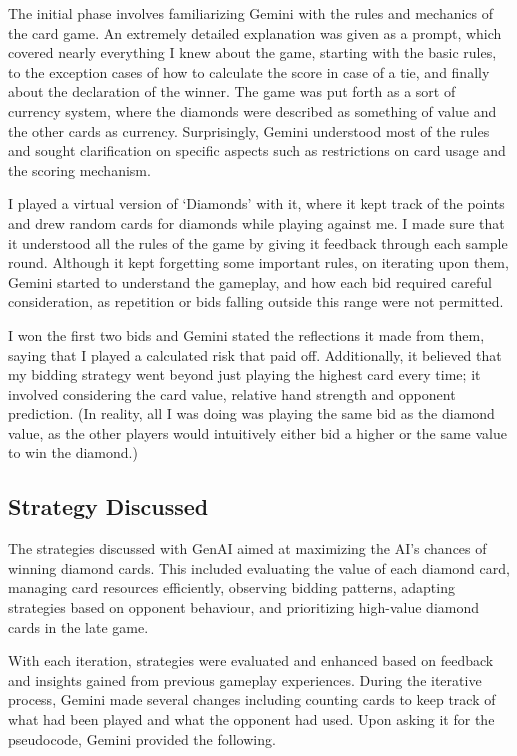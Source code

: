 \documentclass{article}
\begin{document}
The initial phase involves familiarizing Gemini with the rules and mechanics of the card game. An extremely detailed explanation was given as a prompt, which covered nearly everything I knew about the game, starting with the basic rules, to the exception cases of how to calculate the score in case of a tie, and finally about the declaration of the winner. The game was put forth as a sort of currency system, where the diamonds were described as something of value and the other cards as currency. Surprisingly, Gemini understood most of the rules and sought clarification on specific aspects such as restrictions on card usage and the scoring mechanism.
\vspace{10pt}

I played a virtual version of ‘Diamonds’ with it, where it kept track of the points and drew random cards for diamonds while playing against me. I made sure that it understood all the rules of the game by giving it feedback through each sample round. Although it kept forgetting some important rules, on iterating upon them, Gemini started to understand the gameplay, and how each bid required careful consideration, as repetition or bids falling outside this range were not permitted.
\vspace{10pt}

I won the first two bids and Gemini stated the reflections it made from them, saying that I played a calculated risk that paid off. Additionally, it believed that my bidding strategy went beyond just playing the highest card every time; it involved considering the card value, relative hand strength and opponent prediction. (In reality, all I was doing was playing the same bid as the diamond value, as the other players would intuitively either bid a higher or the same value to win the diamond.)

\vspace{7pt}
\subsection{Strategy Discussed}

The strategies discussed with GenAI aimed at maximizing the AI’s chances of winning diamond cards. This included evaluating the value of each diamond card, managing card resources efficiently, observing bidding patterns, adapting strategies based on opponent behaviour, and prioritizing high-value diamond cards in the late game.
\vspace{10pt}

With each iteration, strategies were evaluated and enhanced based on feedback and insights gained from previous gameplay experiences. During the iterative process, Gemini made several changes including counting cards to keep track of what had been played and what the opponent had used. Upon asking it for the pseudocode, Gemini provided the following.
\end{document}
